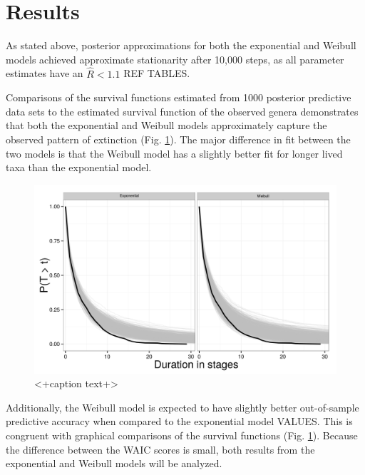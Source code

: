 \documentclass[12pt,letterpaper]{article}
\begin{document}
\section{Results}

As stated above, posterior approximations for both the exponential and Weibull models achieved approximate stationarity after 10,000 steps, as all parameter estimates have an \(\hat{R} < 1.1\) \uppercase{ref tables}. 

Comparisons of the survival functions estimated from 1000 posterior predictive data sets to the estimated survival function of the observed genera demonstrates that both the exponential and Weibull models approximately capture the observed pattern of extinction (Fig. \ref{fig:surv}). The major difference in fit between the two models is that the Weibull model has a slightly better fit for longer lived taxa than the exponential model.

\begin{figure}[ht]
  \centering
  \includegraphics[height = 0.5\textheight,width=\textwidth,keepaspectratio=true]{figure/survival_curves}
  \caption{<+caption text+>}
  \label{fig:surv}
\end{figure}


Additionally, the Weibull model is expected to have slightly better out-of-sample predictive accuracy when compared to the exponential model \uppercase{values}. This is congruent with graphical comparisons of the survival functions (Fig. \ref{fig:surv}). Because the difference between the WAIC scores is small, both results from the exponential and Weibull models will be analyzed.
\end{document}

